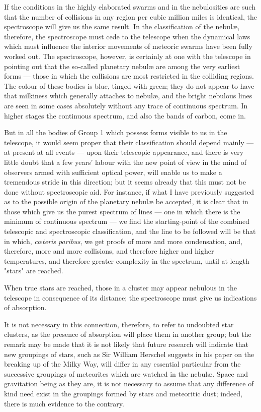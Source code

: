 \documentclass[a4paper, 12pt, oneside, polutonikogreek, english]{article}
\begin{document}
If the conditions in the highly elaborated swarms and in the nebulosities are such that the number of collisions in any region per cubic million miles is identical, the spectroscope will give us the same result. In the classification of the nebulæ, therefore, the spectroscope must cede to the telescope when the dynamical laws which must influence the interior movements of meteoric swarms have been fully worked out. The spectroscope, however, is certainly at one with the telescope in pointing out that the so-called planetary nebulæ are among the very earliest forms --- those in which the collisions are most restricted in the colliding regions. The colour of these bodies is blue, tinged with green; they do not appear to have that milkiness which generally attaches to nebulæ, and the bright nebulous lines are seen in some cases absolutely without any trace of continuous spectrum. In higher stages the continuous spectrum, and also the bands of carbon, come in.

But in all the bodies of Group 1 which possess forms visible to us in the telescope, it would seem proper that their classification should depend mainly --- at present at all events --- upon their telescopic appearance, and there is very little doubt that a few years' labour with the new point of view in the mind of observers armed with sufficient optical power, will enable us to make a tremendous stride in this direction; but it seems already that this must not be done without spectroscopic aid. For instance, if what I have previously suggested as to the possible origin of the planetary nebulæ be accepted, it is clear that in those which give us the purest spectrum of lines --- one in which there is the minimum of continuous spectrum --- we find the starting-point of the combined telescopic and spectroscopic classification, and the line to be followed will be that in which, \emph{cœteris paribus}, we get proofs of more and more condensation, and, therefore, more and more collisions, and therefore higher and higher temperatures, and therefore greater complexity in the spectrum, until at length "stars" are reached.

When true stars are reached, those in a cluster may appear nebulous in the telescope in consequence of its distance; the spectroscope must give us indications of absorption.

It is not necessary in this connection, therefore, to refer to undoubted star clusters, as the presence of absorption will place them in another group; but the remark may be made that it is not likely that future research will indicate that new groupings of stars, such as Sir William Herschel suggests in his paper on the breaking up of the Milky Way, will differ in any essential particular from the successive groupings of meteorites which are watched in the nebulæ. Space and gravitation being as they are, it is not necessary to assume that any difference of kind need exist in the groupings formed by stars and meteoritic dust; indeed, there is much evidence to the contrary.
\end{document}
